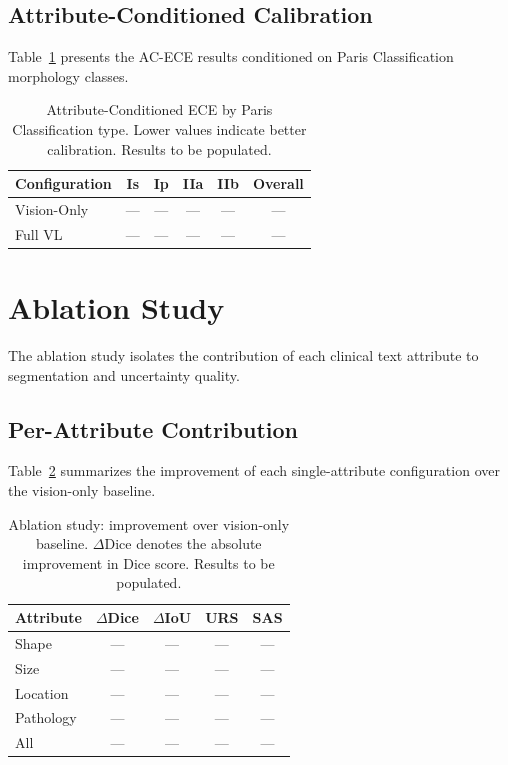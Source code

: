\subsection{Attribute-Conditioned Calibration}
\label{sec:eval:acece_results}

Table~\ref{tab:acece} presents the \ac{AC-ECE} results conditioned on Paris Classification morphology classes.

\begin{table}[htbp]
	\caption{Attribute-Conditioned ECE by Paris Classification type. Lower values indicate better calibration. Results to be populated.}
	\label{tab:acece}
	\centering
	\begin{tabular}{lccccc}
		\toprule
		\textbf{Configuration} & \textbf{Is} & \textbf{Ip} & \textbf{IIa} & \textbf{IIb} & \textbf{Overall} \\
		\midrule
		Vision-Only  & ---   & ---   & ---    & ---    & ---   \\
		Full VL      & ---   & ---   & ---    & ---    & ---   \\
		\bottomrule
	\end{tabular}
\end{table}


\section{Ablation Study}
\label{sec:eval:ablation}

The ablation study isolates the contribution of each clinical text attribute to segmentation and uncertainty quality.

\subsection{Per-Attribute Contribution}
\label{sec:eval:perattr}

Table~\ref{tab:ablation_summary} summarizes the improvement of each single-attribute configuration over the vision-only baseline.

\begin{table}[htbp]
	\caption{Ablation study: improvement over vision-only baseline. $\Delta$Dice denotes the absolute improvement in Dice score. Results to be populated.}
	\label{tab:ablation_summary}
	\centering
	\begin{tabular}{lcccc}
		\toprule
		\textbf{Attribute} & $\Delta$\textbf{Dice} & $\Delta$\textbf{IoU} & \textbf{URS} & \textbf{SAS} \\
		\midrule
		Shape     & ---   & ---   & ---   & ---   \\
		Size      & ---   & ---   & ---   & ---   \\
		Location  & ---   & ---   & ---   & ---   \\
		Pathology & ---   & ---   & ---   & ---   \\
		All       & ---   & ---   & ---   & ---   \\
		\bottomrule
	\end{tabular}
\end{table}


